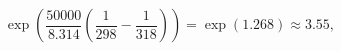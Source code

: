 \documentclass[preview]{standalone}
\begin{document}
\[
\exp\left(\frac{50000}{8.314}\left(\frac{1}{298} - \frac{1}{318}\right)\right) = \exp(1.268) \approx 3.55,
\]
\end{document}
